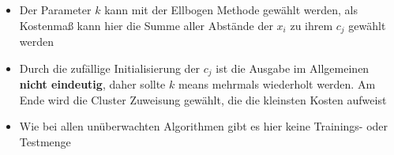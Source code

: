 \begin{frame}
\begin{itemize}[<+->]
\item Der Parameter $k$ kann mit der Ellbogen Methode gewählt werden, als Kostenmaß kann hier die Summe aller Abstände der $x_i$ zu ihrem $c_j$ gewählt werden
\item Durch die zufällige Initialisierung der $c_j$ ist die Ausgabe im Allgemeinen \textbf{nicht eindeutig}, daher sollte $k$ means mehrmals wiederholt werden. Am Ende wird die Cluster Zuweisung gewählt, die die kleinsten Kosten aufweist
\item Wie bei allen unüberwachten Algorithmen gibt es hier keine Trainings- oder Testmenge
\end{itemize}
\end{frame}